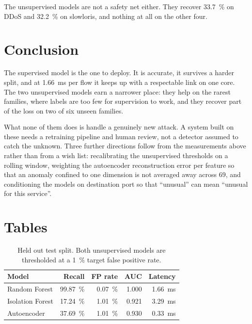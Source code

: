 \documentclass[9pt,a4paper,twocolumn]{article}
\begin{document}
The unsupervised models are not a safety net either. They recover
\SI{33.7}{\percent} on DDoS and \SI{32.2}{\percent} on slowloris, and nothing at
all on the other four.

\section{Conclusion}

The supervised model is the one to deploy. It is accurate, it survives a
harder split, and at \SI{1.66}{\milli\second} per flow it keeps up with a
respectable link on one core. The two unsupervised models earn a narrower place:
they help on the rarest families, where labels are too few for supervision to
work, and they recover part of the loss on two of six unseen families.

What none of them does is handle a genuinely new attack. A system built on these
needs a retraining pipeline and human review, not a detector assumed to catch
the unknown. Three further directions follow from the measurements above rather
than from a wish list: recalibrating the unsupervised thresholds on a rolling
window, weighting the autoencoder reconstruction error per feature so that an
anomaly confined to one dimension is not averaged away across 69, and
conditioning the models on destination port so that ``unusual'' can mean
``unusual for this service''.

\clearpage
\onecolumn
\appendix

\section{Tables}

\begin{table}[H]
  \centering
  \small
  \caption{Held out test split. Both unsupervised models are thresholded at a
  \SI{1}{\percent} target false positive rate.}
  \label{tab:results}
  \begin{tabular}{lrrrr}
    \toprule
    Model & Recall & FP rate & AUC & Latency \\
    \midrule
    Random Forest    & \SI{99.87}{\percent} & \SI{0.07}{\percent} & 1.000 & \SI{1.66}{\milli\second} \\
    Isolation Forest & \SI{17.24}{\percent} & \SI{1.01}{\percent} & 0.921 & \SI{3.29}{\milli\second} \\
    Autoencoder      & \SI{37.69}{\percent} & \SI{1.01}{\percent} & 0.930 & \SI{0.33}{\milli\second} \\
    \bottomrule
  \end{tabular}
\end{table}
\end{document}
